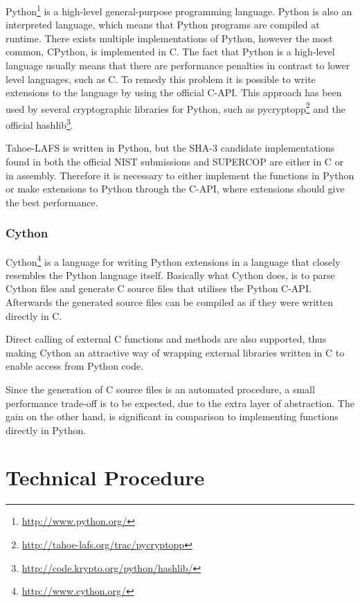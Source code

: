 \documentclass[english,12pt,a4paper]{book}
\begin{document}
Python\footnote{\url{http://www.python.org/}} is a high-level general-purpose
programming language. Python is also an interpreted language, which means that
Python programs are compiled at runtime. There exists multiple implementations
of Python, however the most common, CPython, is implemented in C. The fact that
Python is a high-level language usually means that there are performance
penalties in contrast to lower level languages, such as C. To remedy this
problem it is possible to write extensions to the language by using the official
C-API. This approach has been used by several cryptographic libraries for
Python, such as pycryptopp\footnote{\url{http://tahoe-lafs.org/trac/pycryptopp}}
and the official hashlib\footnote{\url{http://code.krypto.org/python/hashlib/}}.

Tahoe-\ac{LAFS} is written in Python, but the SHA-3 candidate implementations found
in both the official NIST submissions and SUPERCOP are either in C or in
assembly. Therefore it is necessary to either implement the functions in Python
or make extensions to Python through the C-API, where extensions should give
the best performance.

\subsection{Cython}
Cython\footnote{\url{http://www.cython.org/}} is a language for writing Python
extensions in a language that closely resembles the Python language itself.
Basically what Cython does, is to parse Cython files and generate C source files
that utilises the Python C-API. Afterwards the generated source files can be
compiled as if they were written directly in C.

Direct calling of external C functions and methods are also supported, thus
making Cython an attractive way of wrapping external libraries written in C to
enable access from Python code.

Since the generation of C source files is an automated procedure, a small
performance trade-off is to be expected, due to the extra layer of abstraction.
The gain on the other hand, is significant in comparison to implementing
functions directly in Python.

\chapter{Technical Procedure}
\end{document}
